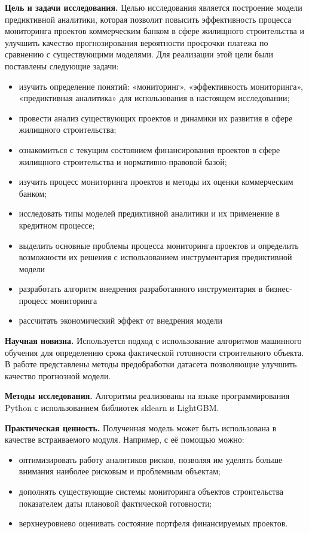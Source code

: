 \documentclass[12pt,a4paper]{article} %
\begin{document}
\textbf{Цель и задачи исследования.} Целью исследования является построение модели предиктивной аналитики, которая позволит повысить эффективность процесса мониторинга проектов коммерческим банком в сфере жилищного строительства и улучшить качество прогнозирования вероятности просрочки платежа по сравнению с существующими моделями. Для реализации этой цели были поставлены следующие задачи:
\begin{itemize}
	\item изучить определение понятий: «мониторинг», «эффективность мониторинга», «предиктивная аналитика» для использования в настоящем исследовании;
	\item провести анализ существующих проектов и динамики их развития в сфере жилищного строительства;
	\item ознакомиться с текущим состоянием финансирования проектов в сфере жилищного строительства и нормативно-правовой базой;
	\item изучить процесс мониторинга проектов и методы их оценки коммерческим банком;
	\item исследовать типы моделей предиктивной аналитики и их применение в кредитном процессе;
	\item выделить основные проблемы процесса мониторинга проектов и определить возможности их решения с использованием инструментария предиктивной модели 
	\item разработать алгоритм внедрения разработанного инструментария в бизнес-процесс мониторинга
	\item рассчитать экономический эффект от внедрения модели 
\end{itemize}

\bigskip

\textbf{Научная новизна.} Используется подход с использование алгоритмов машинного обучения для определению срока фактической готовности строительного объекта. В работе представлены методы предобработки датасета позволяющие улучшить качество прогнозной модели.

\bigskip

\textbf{Методы исследования.} Алгоритмы реализованы на языке программирования Python с использованием библиотек sklearn и LightGBM.

\bigskip

\textbf{Практическая ценность.} Полученная модель может быть использована в качестве встраиваемого модуля. Например, с её помощью можно:
\begin{itemize}
	\item оптимизировать работу аналитиков рисков, позволяя им уделять больше внимания наиболее рисковым и проблемным объектам;
	\item дополнять существующие системы мониторинга объектов строительства показателем даты плановой фактической готовности;
	\item верхнеуровнево оценивать состояние портфеля финансируемых проектов.
\end{itemize}
\end{document}
